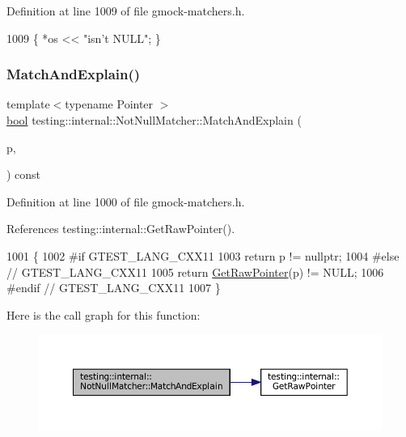 Definition at line 1009 of file gmock-\/matchers.\+h.


\begin{DoxyCode}
1009 \{ *os << \textcolor{stringliteral}{"isn't NULL"}; \}
\end{DoxyCode}
\mbox{\label{classtesting_1_1internal_1_1NotNullMatcher_a8c4b04f9a91550176a6e23652f592b8e}} 
\subsubsection{\texorpdfstring{Match\+And\+Explain()}{MatchAndExplain()}}
{\footnotesize\ttfamily template$<$typename Pointer $>$ \\
\hyperlink{classbool}{bool} testing\+::internal\+::\+Not\+Null\+Matcher\+::\+Match\+And\+Explain (\begin{DoxyParamCaption}\item[{const Pointer \&}]{p,  }\item[{\hyperlink{classtesting_1_1MatchResultListener}{Match\+Result\+Listener} $\ast$}]{ }\end{DoxyParamCaption}) const\hspace{0.3cm}{\ttfamily [inline]}}



Definition at line 1000 of file gmock-\/matchers.\+h.



References testing\+::internal\+::\+Get\+Raw\+Pointer().


\begin{DoxyCode}
1001                                                      \{
1002 \textcolor{preprocessor}{#if GTEST\_LANG\_CXX11}
1003     \textcolor{keywordflow}{return} p != \textcolor{keyword}{nullptr};
1004 \textcolor{preprocessor}{#else  // GTEST\_LANG\_CXX11}
1005     \textcolor{keywordflow}{return} \hyperlink{namespacetesting_1_1internal_ae88d1a6f95165c43c27a6c0e2d357e61}{GetRawPointer}(p) != NULL;
1006 \textcolor{preprocessor}{#endif  // GTEST\_LANG\_CXX11}
1007   \}
\end{DoxyCode}
Here is the call graph for this function\+:
\nopagebreak
\begin{figure}[H]
\begin{center}
\leavevmode
\includegraphics[width=350pt]{classtesting_1_1internal_1_1NotNullMatcher_a8c4b04f9a91550176a6e23652f592b8e_cgraph}
\end{center}
\end{figure}


